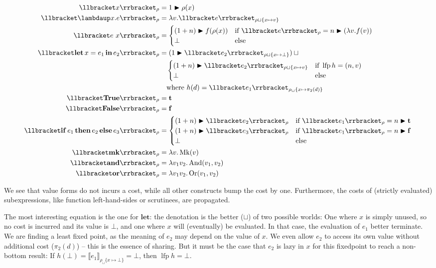 \documentclass[manuscript,screen,acmsmall,nonacm]{acmart}
\newcommand{\syntax}[1]{\mathbf{#1}}
\newcommand{\slambda}{\syntax{\lambdaup}}
\newcommand{\sLet}[3]{\syntax{let}\,#1=#2\,\syntax{in}\,#3}
\newcommand{\sTrue}{\syntax{True}}
\newcommand{\sFalse}{\syntax{False}}
\newcommand{\sIf}[3]{\syntax{if}\,#1\,\syntax{then}\,#2\,\syntax{else}\,#3}
\newcommand{\sMk}{\syntax{mk}}
\newcommand{\sAnd}{\syntax{and}}
\newcommand{\sOr}{\syntax{or}}
\newcommand{\dFalse}{\mathbf{f}}
\newcommand{\dTrue}{\mathbf{t}}
\newcommand{\lfp}{\operatorname{lfp}}
\newcommand{\dlambda}{\mathit{\lambda}}
\newcommand{\dMk}{\operatorname{Mk}}
\newcommand{\dAnd}{\operatorname{And}}
\newcommand{\dOr}{\operatorname{Or}}
\newcommand{\D}[1]{\llbracket #1 \rrbracket}
\begin{document}
\begin{align*}
\D{x}_\rho &= 1 \bump \rho(x) \\
\D{\slambda x. e}_\rho &= \dlambda v. \D{e}_{\rho \sqcup \{x \mapsto v\}} \\
\D{e~x}_\rho &=
\begin{cases}
(1+n) \bump f(\rho(x)) &\text{if } \D{e}_\rho = n \bump (\dlambda v. f(v)) \\
\bot &\text{else}
\end{cases}\\
\D{\sLet{x}{e_1}{e_2}}_\rho &=
(1 \bump \D{e_2}_{\rho \sqcup \{x \mapsto \bot \}})
\sqcup\strut\\
&\quad
\begin{cases}
(1+n) \bump \D{e_2}_{\rho \sqcup \{x \mapsto v \}}
&\text{if } \lfp h = (n,v)\\
\bot &\text{else}
\end{cases}\\
& \quad \text{where }
h(d) = \D{e_1}_{\rho_\sqcup\{x \mapsto \pi_2(d)\}}\\
\D{\sTrue}_\rho &= \dTrue\\
\D{\sFalse}_\rho &= \dFalse\\
\D{\sIf{e_1}{e_2}{e_3}}_\rho &=
\begin{cases}
(1+n) \bump \D{e_2}_\rho &\text{if } \D{e_1}_\rho = n \bump \dTrue \\
(1+n) \bump \D{e_3}_\rho &\text{if } \D{e_1}_\rho = n \bump \dFalse \\
\bot &\text{else}
\end{cases} \\
\D{\sMk}_\rho &= \dlambda v. \dMk(v) \\
\D{\sAnd}_\rho &= \dlambda v_1 v_2. \dAnd(v_1, v_2)\\
\D{\sOr}_\rho &= \dlambda v_1 v_2. \dOr(v_1, v_2)
\end{align*}

We see that value forms do not incurs a cost, while all other constructs bump the cost by one. Furthermore, the costs of (strictly evaluated) subexpressions, like function left-hand-sides or scrutinees, are propagated.

The most interesting equation is the one for $\syntax{let}$: the denotation is the better ($\sqcup$) of two possible worlds: One where $x$ is simply unused, so no cost is incurred and its value is $\bot$, and one where $x$ will (eventually) be evaluated. In that case, the evaluation of $e_1$ better terminate. 
We are finding a least fixed point, as the meaning of $e_2$ may depend on the value of $x$. We even allow $e_2$ to access its own value without additional cost ($\pi_2(d)$) -- this is the essence of sharing. But it must be the case that $e_2$ is lazy in $x$ for this fixedpoint to reach a non-bottom result: If $h(\bot) = \D{e_1}_{\rho_\sqcup\{x \mapsto \bot\}} = \bot$, then $\lfp h = \bot$.
\end{document}

